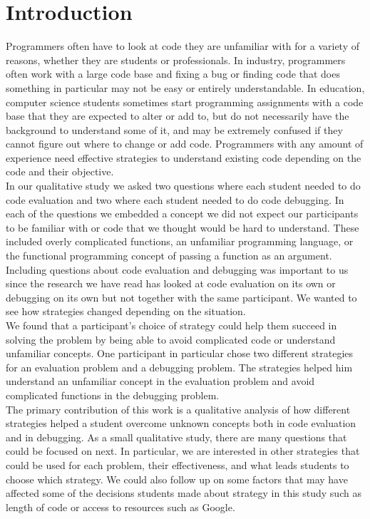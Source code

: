 \section{Introduction}

Programmers often have to look at code they are unfamiliar with for a variety of reasons, whether they are students or professionals.
In industry, programmers often work with a large code base and fixing a bug or finding code that does something in particular may not be easy or entirely understandable.
In education, computer science students sometimes start programming assignments with a code base that they are expected to alter or add to, but do not necessarily have the background to understand some of it, and may be extremely confused if they cannot figure out where to change or add code.
Programmers with any amount of experience need effective strategies to understand existing code depending on the code and their objective. \\

In our qualitative study we asked two questions where each student needed to do code evaluation and two where each student needed to do code debugging.
In each of the questions we embedded a concept we did not expect our participants to be familiar with or code that we thought would be hard to understand.
These included overly complicated functions, an unfamiliar programming language, or the functional programming concept of passing a function as an argument.
Including questions about code evaluation and debugging was important to us since the research we have read has looked at code evaluation on its own or debugging on its own but not together with the same participant.
We wanted to see how strategies changed depending on the situation. \\

We found that a participant's choice of strategy could help them succeed in solving the problem by being able to avoid complicated code or understand unfamiliar concepts.
One participant in particular chose two different strategies for an evaluation problem and a debugging problem.
The strategies helped him understand an unfamiliar concept in the evaluation problem and avoid complicated functions in the debugging problem. \\

The primary contribution of this work is a qualitative analysis of how different strategies helped a student overcome unknown concepts both in code evaluation and in debugging.
As a small qualitative study, there are many questions that could be focused on next.
In particular, we are interested in other strategies that could be used for each problem, their effectiveness, and what leads students to choose which strategy.
We could also follow up on some factors that may have affected some of the decisions students made about strategy in this study such as length of code or access to resources such as Google.\\

\newpage